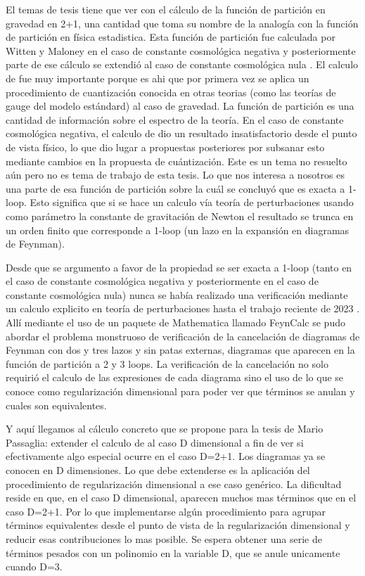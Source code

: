 \documentclass[A4paper,12pt]{article}
\begin{document}
El temas de tesis tiene que ver con el cálculo de la función de partición en gravedad en 2+1, una cantidad que toma su nombre de la analogía con la función de partición en física estadistica. Esta función de partición fue calculada por Witten y Maloney \cite{MaloneyWitten} en el caso de constante cosmológica negativa y posteriormente parte de ese cálculo se extendió al caso de constante cosmológica nula \cite{Barnich}. El calculo de \cite{MaloneyWitten} fue muy importante porque es ahi que por primera vez se aplica un procedimiento de cuantización conocida en otras teorias (como las teorías de gauge del modelo estándard) al caso de gravedad. La función de partición es una cantidad de información sobre el espectro de la teoría.  En el caso de constante cosmológica negativa, el calculo de \cite{MaloneyWitten} dio un resultado insatisfactorio desde el punto de vista físico, lo que dio lugar a propuestas posteriores por subsanar esto mediante cambios en la propuesta de cuántización. Este es un tema no resuelto aún pero no es tema de trabajo de esta tesis. Lo que nos interesa a nosotros es una parte de esa función de partición sobre la cuál se concluyó que es exacta a 1-loop. Esto significa que si se hace un calculo vía teoría de perturbaciones usando como parámetro la constante de gravitación de Newton el resultado se trunca en un orden finito que corresponde a 1-loop (un lazo en la expansión en diagramas de Feynman).

Desde que se argumento a favor de la propiedad se ser exacta a 1-loop (tanto en el caso de constante cosmológica negativa y posteriormente en el caso de constante cosmológica nula) nunca se había realizado una verificación mediante un calculo explicito en teoría de perturbaciones hasta el trabajo reciente de 2023 \cite{Leston}.  Allí mediante el uso de un paquete de Mathematica llamado FeynCalc \cite{Feyncalc} se pudo abordar el problema monstruoso de verificación de la cancelación de diagramas de Feynman con dos y tres lazos y sin patas externas, diagramas que aparecen en la función de partición a 2 y 3 loops. La verificación de la cancelación no solo requirió el calculo de las expresiones de cada diagrama sino el uso de lo que se conoce como regularización dimensional para poder ver que términos se anulan y cuales son equivalentes.

Y aquí llegamos al cálculo concreto que se propone para la tesis de Mario Passaglia: extender el calculo de \cite{Leston} al  caso D dimensional a fin de ver si efectivamente algo especial ocurre en el caso D=2+1. Los diagramas ya se conocen en D dimensiones. Lo que debe extenderse es la aplicación del procedimiento de regularización dimensional a ese caso genérico. La dificultad reside  en que, en el caso D dimensional, aparecen muchos mas términos que en el caso D=2+1. Por lo que implementarse algún procedimiento para agrupar términos equivalentes desde el punto de vista de la regularización dimensional y reducir esas contribuciones lo mas posible. Se espera obtener una serie de términos pesados con un polinomio en la variable D, que se anule unicamente cuando D=3.
\end{document}
